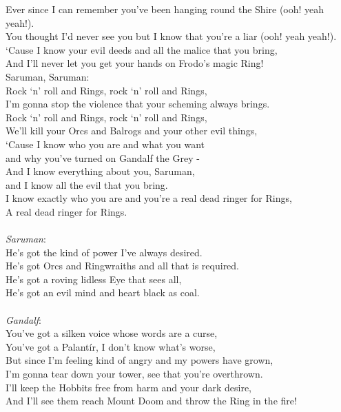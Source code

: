 \begin{multicols}{2}
Ever since I can remember you’ve been hanging round the Shire (ooh! yeah yeah!).
\\
You thought I’d never see you but I know that you’re a liar (ooh! yeah yeah!).
\\
‘Cause I know your evil deeds and all the malice that you bring,
\\
And I’ll never let you get your hands on Frodo’s magic Ring!
\\
Saruman, Saruman:
\\
Rock ‘n’ roll and Rings, rock ‘n’ roll and Rings,
\\
I’m gonna stop the violence that your scheming always brings.
\\
Rock ‘n’ roll and Rings, rock ‘n’ roll and Rings,
\\
We’ll kill your Orcs and Balrogs and your other evil things,
\\
‘Cause I know who you are and what you want 
\\
and why you’ve turned on Gandalf the Grey -
\\
And I know everything about you, Saruman, 
\\
and I know all the evil that you bring.
\\
I know exactly who you are and you’re a real dead ringer for Rings,
\\
A real dead ringer for Rings.
\\
\\
\textit{Saruman}:
\\
He’s got the kind of power I’ve always desired.
\\
He’s got Orcs and Ringwraiths and all that is required.
\\
He’s got a roving lidless Eye that sees all,
\\
He’s got an evil mind and heart black as coal.
\\
\\
\textit{Gandalf}:
\\
You’ve got a silken voice whose words are a curse,
\\
You’ve got a Palant\'ir, I don’t know what’s worse,
\\
But since I’m feeling kind of angry and my powers have grown,
\\
I’m gonna tear down your tower, see that you’re overthrown.
\\
I’ll keep the Hobbits free from harm and your dark desire,
\\
And I’ll see them reach Mount Doom and throw the Ring in the fire!
\\

\end{multicols}
